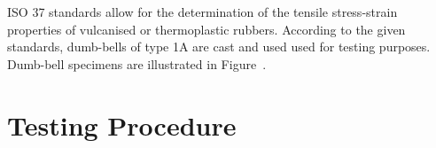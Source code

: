 ISO 37 standards allow for the determination of the tensile stress-strain properties of vulcanised or thermoplastic rubbers. According to the given standards, dumb-bells of type 1A are cast and used used for testing purposes. Dumb-bell specimens are illustrated in Figure~.

\section{Testing Procedure}
